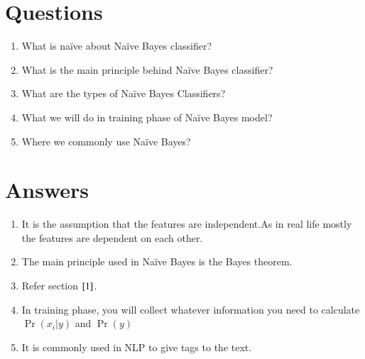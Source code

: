 \documentclass[journal,12pt,onecolumn]{IEEEtran}
\providecommand{\pr}[1]{\ensuremath{\Pr\left(#1\right)}}
\theoremstyle{remark}
\numberwithin{equation}{section}
\begin{document}
	    \section{Questions}
	      \begin{enumerate}
	       \item What is na\"ive about Na\"ive Bayes classifier?
	       \item What is the main principle behind Na\"ive Bayes classifier?
	       \item What are the types of Na\"ive Bayes Classifiers?
	       \item What we will do in training phase of Na\"ive Bayes model?
               \item Where we commonly use Na\"ive Bayes?
              \end{enumerate}
	    \section{Answers}
	      \begin{enumerate}
	       \item It is the assumption that the features are independent.As in real life mostly the features are dependent on each other.
	       \item The main principle used in Na\"ive Bayes is the Bayes theorem.
	       \item Refer section $\ref{1}$.
	       \item In training phase, you will collect whatever information you need to calculate $\pr{x_i|y}$ and $\pr{y}$
	       \item It is commonly used in NLP to give tags to the text.
	      \end{enumerate}
        
\end{document}
